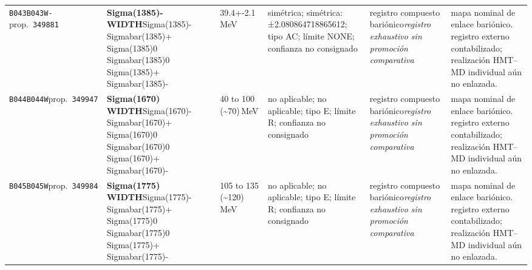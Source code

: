 \begin{landscape}
\begin{longtable}{L{1.85cm}L{4.45cm}L{2.35cm}L{4.05cm}L{3.35cm}L{7.15cm}}
\texttt{B043}\newline \texttt{B043W-}\newline prop.\ \texttt{349881} & \textbf{Sigma(1385)- WIDTH}\newline Sigma(1385)- \textbar{}\allowbreak{} Sigmabar(1385)+ \textbar{}\allowbreak{} Sigma(1385)0 \textbar{}\allowbreak{} Sigmabar(1385)0 \textbar{}\allowbreak{} Sigma(1385)+ \textbar{}\allowbreak{} Sigmabar(1385)- & 39.4+-2.1\,MeV & simétrica; simétrica: ±2.080864718865612; tipo AC; límite NONE; confianza no consignado & registro compuesto bariónico\newline \emph{registro exhaustivo sin promoción comparativa} & mapa nominal de enlace bariónico. registro externo contabilizado; realización HMT--MD individual aún no enlazada. \\
\texttt{B044}\newline \texttt{B044W}\newline prop.\ \texttt{349947} & \textbf{Sigma(1670) WIDTH}\newline Sigma(1670)- \textbar{}\allowbreak{} Sigmabar(1670)+ \textbar{}\allowbreak{} Sigma(1670)0 \textbar{}\allowbreak{} Sigmabar(1670)0 \textbar{}\allowbreak{} Sigma(1670)+ \textbar{}\allowbreak{} Sigmabar(1670)- & 40 to 100 (\textasciitilde{}70)\,MeV & no aplicable; no aplicable; tipo E; límite R; confianza no consignado & registro compuesto bariónico\newline \emph{registro exhaustivo sin promoción comparativa} & mapa nominal de enlace bariónico. registro externo contabilizado; realización HMT--MD individual aún no enlazada. \\
\texttt{B045}\newline \texttt{B045W}\newline prop.\ \texttt{349984} & \textbf{Sigma(1775) WIDTH}\newline Sigma(1775)- \textbar{}\allowbreak{} Sigmabar(1775)+ \textbar{}\allowbreak{} Sigma(1775)0 \textbar{}\allowbreak{} Sigmabar(1775)0 \textbar{}\allowbreak{} Sigma(1775)+ \textbar{}\allowbreak{} Sigmabar(1775)- & 105 to 135 (\textasciitilde{}120)\,MeV & no aplicable; no aplicable; tipo E; límite R; confianza no consignado & registro compuesto bariónico\newline \emph{registro exhaustivo sin promoción comparativa} & mapa nominal de enlace bariónico. registro externo contabilizado; realización HMT--MD individual aún no enlazada. \\

\end{longtable}
\end{landscape}
